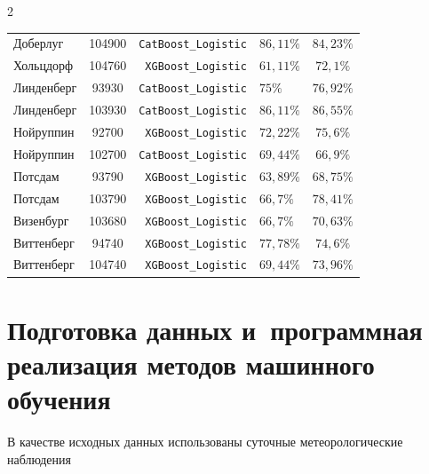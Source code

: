 \begin{multicols}{2}
\begin{table}[b]
\begin{center}
\begin{tabular}{|l|c|r|l|c|}
    Доберлуг &  104900 &  \verb"CatBoost_Logistic" &  $86{,}11\%$ & $ 84{,}23\%$ \\

    Хольцдорф&  104760 &   \verb"XGBoost_Logistic" &  $61{,}11\%$ &  $72{,}1\%$\hphantom{9} \\

  Линденберг &   \hphantom{9}93930 &  \verb"CatBoost_Logistic" &  $75\%$ &  $76{,}92\%$ \\

  Линденберг &  103930 &  \verb"CatBoost_Logistic" &  $86{,}11\%$ &  $86{,}55\%$ \\

   Нойруппин &   \hphantom{9}92700 &   \verb"XGBoost_Logistic" &  $72{,}22\%$ & $ 75{,}6\%$\hphantom{9} \\

   Нойруппин &  102700 &  \verb"CatBoost_Logistic" &  $69{,}44\%$ &  $66{,}9\%$\hphantom{9} \\

     Потсдам &   \hphantom{9}93790 &   \verb"XGBoost_Logistic" &  $63{,}89\%$ &  $68{,}75\%$ \\

     Потсдам &  103790 &   \verb"XGBoost_Logistic" &  $66{,}7\%$ &  $78{,}41\%$ \\

  Визенбург &  103680 &   \verb"XGBoost_Logistic" & $66{,}7\%$ &  $70{,}63\%$ \\

  Виттенберг &   \hphantom{9}94740 &   \verb"XGBoost_Logistic" &  $77{,}78\%$ &  $74{,}6\%$\hphantom{9} \\

  Виттенберг &  104740 &   \verb"XGBoost_Logistic" &  $69{,}44\%$ &  $73{,}96\%$ \\

\hline

\end{tabular}

\end{center}

\end{table}



\section{Подготовка данных и~программная реализация методов машинного обучения}



В качестве исходных данных использованы суточные метеорологические наблюдения 


\end{multicols}
